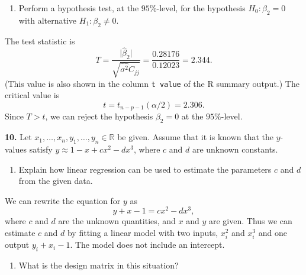 \documentclass[
  a4paper,
]{article}
\providecommand{\tightlist}{%
  \setlength{\itemsep}{0pt}\setlength{\parskip}{0pt}}
\theoremstyle{definition}
\theoremstyle{definition}
\theoremstyle{definition}
\theoremstyle{definition}
\theoremstyle{remark}
\begin{document}
\begin{enumerate}
\def\labelenumi{\alph{enumi}.}
\setcounter{enumi}{2}
\tightlist
\item
  Perform a hypothesis test, at the \(95\%\)-level, for the
  hypothesis \(H_0\colon \beta_2 = 0\) with alternative \(H_1\colon \beta_2 \neq 0\).
\end{enumerate}

\begin{myanswers}
The test statistic is
\begin{equation*}
  T
  = \frac{\bigl|\hat\beta_2\bigr|}{\sqrt{\widehat{\sigma^2} C_{jj}} }
  = \frac{0.28176}{0.12023}
  = 2.344.
\end{equation*}
(This value is also shown in the column \texttt{t\ value} of the R
summary output.) The critical value is
\begin{equation*}
  t
  = t_{n-p-1}(\alpha/2)
  = 2.306.
\end{equation*}
Since \(T > t\), we can reject the hypothesis \(\beta_2 = 0\) at the
\(95\%\)-level.

\end{myanswers}

\textbf{10.} Let \(x_1, \ldots, x_n, y_1, \ldots, y_n \in \mathbb{R}\) be given. Assume
that it is known that the \(y\)-values satisfy
\(y \approx 1 - x + c x^2 - d x^3\), where \(c\) and \(d\) are unknown
constants.

\begin{enumerate}
\def\labelenumi{\alph{enumi}.}
\tightlist
\item
  Explain how linear regression can be used to estimate the
  parameters \(c\) and \(d\) from the given data.
\end{enumerate}

\begin{myanswers}
We can rewrite the equation for \(y\) as
\begin{equation*}
  y + x - 1 = c x^2 - d x^3,
\end{equation*}
where \(c\) and \(d\) are the unknown quantities, and \(x\) and \(y\)
are given. Thus we can estimate \(c\) and \(d\) by fitting
a linear model with two inputs, \(x_i^2\) and \(x_i^3\)
and one output \(y_i + x_i - 1\). The model does not include
an intercept.

\end{myanswers}

\begin{enumerate}
\def\labelenumi{\alph{enumi}.}
\setcounter{enumi}{1}
\tightlist
\item
  What is the design matrix in this situation?
\end{enumerate}
\end{document}
